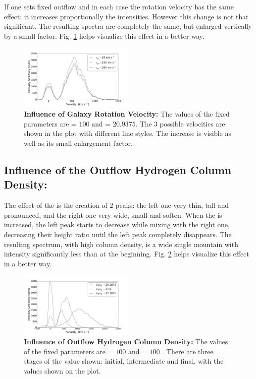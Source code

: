\documentclass{latex/emulateapj}
\begin{document}
If one sets fixed outflow \vout and \lognh in each case the rotation velocity has the same effect: it increases proportionally the intensities. However this change is not that significant. The resulting spectra are completely the same, but enlarged vertically by a small factor. Fig. \ref{fig:influence_vgal} helps visualize this effect in a better way.

\begin{figure}[h!]
\begin{center}
  \includegraphics[width=0.5\textwidth]{./figures/inf_vgal_soft.png}
\end{center}
\caption{\textbf{Influence of Galaxy Rotation Velocity:} The values of the fixed parameters are \vout = $100$ \kms and \lognh = $20.9375$. The 3 possible velocities are shown in the plot with different line styles. The increase is visible as well as its small enlargement factor.\\
\label{fig:influence_vgal}}
\end{figure}

\subsection{Influence of the Outflow Hydrogen Column Density: \lognh }

The effect of the \lognh is the creation of 2 peaks: the left one very thin, tall and pronounced, and the right one very wide, small and soften. When the \lognh is increased, the left peak starts to decrease while mixing with the right one, decreasing their height ratio until the left peak completely disappears. The resulting spectrum, with high column density, is a wide single mountain with intensity significantly less than at the beginning. Fig. \ref{fig:influence_lognH} helps visualize this effect in a better way.

\begin{figure}[h!]
\begin{center}
  \includegraphics[width=0.5\textwidth]{./figures/inf_lognh_soft.png}
\end{center}
\caption{\textbf{Influence of Outflow Hydrogen Column Density:} The values of the fixed parameters are \vout = $100$ \kms and \vgal = $100$ \kms. There are three stages of the \lognh value shown: initial, intermediate and final, with the values shown on the plot.\\
\label{fig:influence_lognH}}
\end{figure}
\end{document}
